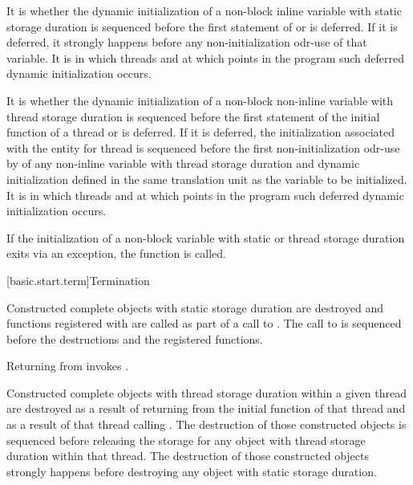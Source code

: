 \pnum
It is 
whether the dynamic initialization of a
non-block inline variable with static storage duration
is sequenced before the first statement of  or is deferred.
If it is deferred, it strongly happens before
any non-initialization odr-use
of that variable.
It is 
in which threads and at which points in the program such deferred dynamic initialization occurs.

\pnum
It is 
whether the dynamic initialization of a
non-block non-inline variable with thread storage duration
is sequenced before the first statement of the initial function of a thread or is deferred.
If it is deferred,
the initialization associated with the entity for thread 
is sequenced before the first non-initialization odr-use by 
of any non-inline variable with thread storage duration
and dynamic initialization
defined in the same translation unit as the variable to be initialized.
It is 
in which threads and at which points in the program such deferred dynamic initialization occurs.

\pnum
If the initialization of
a non-block variable with static or thread storage duration
exits via an exception,
the function  is called.%

[basic.start.term]{Termination}

\pnum
{}%
%
%
Constructed complete objects
with static storage duration are destroyed
and functions registered with 
are called as part of a call to
%
%
.
The call to  is sequenced before
the destructions and the registered functions.
\begin{note}
Returning from  invokes .
\end{note}

\pnum
Constructed complete objects with thread storage duration within a given thread
are destroyed as a result of returning from the initial function of that thread and as a
result of that thread calling .
The destruction of those constructed objects
is sequenced before releasing the storage for
any object with thread storage duration within that thread.
The destruction of those constructed objects
strongly happens before destroying
any object with static storage duration.

